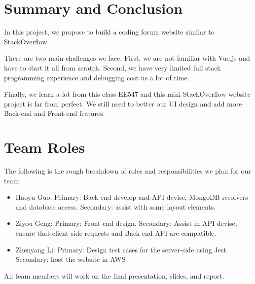 \documentclass[11pt]{article}
\begin{document}
\section{Summary and Conclusion}
In this project, we propose to build a coding forum website similar to StackOverflow. 

There are two main challenges we face. First, we are not familiar with Vue.js and have to start it all from scratch. Second, we have very limited full stack programming experience and debugging cost us a lot of time.

Finally, we learn a lot from this class EE547 and this mini StackOverflow website project is far from perfect. We still need to better our UI design and add more Back-end and Front-end features. 



\section{Team Roles} 

The following is the rough breakdown of roles and responsibilities we plan for our team:
\begin{itemize}
\item Haoyu Guo: Primary: Back-end develop and API devise, MongoDB resolvers and database access.  Secondary: assist with some layout elements.
\item Ziyou Geng: Primary: Front-end design. Secondary: Assist in API devise, ensure that client-side requests and Back-end API are compatible.
\item Zhenyang Li: Primary: Design test cases for the server-side using Jest. Secondary: host the website in AWS
\end{itemize}
All team members will work on the final presentation, slides, and report. 
\end{document}
